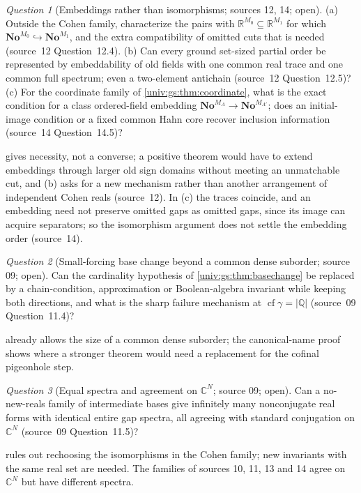 \documentclass[11pt,letterpaper]{article}
\numberwithin{equation}{section}
\theoremstyle{definition}
\theoremstyle{remark}
\newtheorem{question}[question]{Question}
\newcommand{\No}{\mathbf{No}}
\newcommand{\R}{\mathbb R}
\newcommand{\C}{\mathbb C}
\newcommand{\cf}{\operatorname{cf}}
\newcommand{\abs}[1]{\lvert#1\rvert}
\begin{document}
\begin{question}[Embeddings rather than isomorphisms; sources 12, 14; open]\label{univ:gs:q:embeddings}
(a) Outside the Cohen family, characterize the pairs with $\R^{M_0}\subseteq\R^{M_1}$ for which
$\No^{M_0}\hookrightarrow\No^{M_1}$, and the extra compatibility of omitted cuts that is needed
(source~12 Question~12.4). (b) Can every ground set-sized partial order be represented by
embeddability of old fields with one common real trace and one common full spectrum; even a
two-element antichain (source~12 Question~12.5)? (c) For the coordinate family of
\cref{univ:gs:thm:coordinate}, what is the exact condition for a class ordered-field embedding
$\No^{M_A}\to\No^{M_{A'}}$; does an initial-image condition or a fixed common Hahn core recover
inclusion information (source~14 Question~14.5)?
\end{question}
 gives necessity, not a converse; a positive theorem would have to
extend embeddings through larger old sign domains without meeting an unmatchable cut, and (b)
asks for a new mechanism rather than another arrangement of independent Cohen reals
(source~12). In (c) the traces coincide, and an embedding need not preserve omitted gaps as
omitted gaps, since its image can acquire separators; so the isomorphism argument does not settle
the embedding order (source~14).

\begin{question}[Small-forcing base change beyond a common dense suborder; source 09; open]\label{univ:gs:q:basechange}
Can the cardinality hypothesis of \cref{univ:gs:thm:basechange} be replaced by a chain-condition,
approximation or Boolean-algebra invariant while keeping both directions, and what is the sharp
failure mechanism at $\cf\gamma=\abs{\mathbb Q}$ (source~09 Question~11.4)?
\end{question}
 already allows the size of a common dense suborder; the canonical-name
proof shows where a stronger theorem would need a replacement for the cofinal pigeonhole step.

\begin{question}[Equal spectra and agreement on $\C^N$; source 09; open]\label{univ:gs:q:finalconstants}
Can a no-new-reals family of intermediate bases give infinitely many nonconjugate real forms with
identical entire gap spectra, all agreeing with standard conjugation on $\C^N$ (source~09
Question~11.5)?
\end{question}
 rules out rechoosing the isomorphisms in the Cohen family; new
invariants with the same real set are needed. The families of sources 10, 11, 13 and 14 agree on
$\C^N$ but have different spectra.
\end{document}
